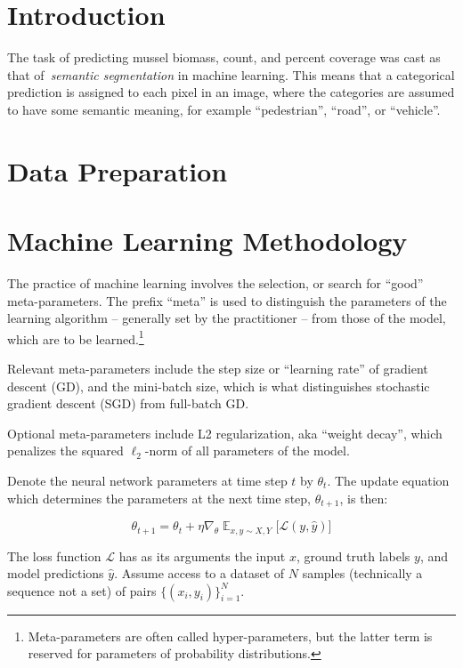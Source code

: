 \documentclass[11pt]{article} %
\begin{document}
\clearpage

\setcounter{page}{1}

\section{Introduction}

The task of predicting mussel biomass, count, and percent coverage was cast as
that of~\emph{semantic segmentation} in machine learning. This means that a 
categorical prediction is assigned to each pixel in an image, where the
categories are assumed to have some semantic meaning, for example 
``pedestrian'', ``road'', or ``vehicle''.

\section{Data Preparation}

\section{Machine Learning Methodology}

The practice of machine learning involves the selection, or search for ``good'' 
meta-parameters. The prefix ``meta'' is used to distinguish the parameters of
the learning algorithm -- generally set by the practitioner -- from those of the
model, which are to be learned.\footnote{Meta-parameters are often called
hyper-parameters, but the latter term is reserved for parameters of 
probability distributions.}

Relevant meta-parameters include the step size or ``learning rate'' of gradient
descent (GD), and the mini-batch size, which is what distinguishes stochastic
gradient descent (SGD) from full-batch GD. 

Optional meta-parameters include L2 regularization, aka ``weight decay'',
which penalizes the squared $\ell_2$-norm of all parameters of the model.

Denote the neural network parameters at time step $t$ by $\theta_t$. The update
equation which determines the parameters at the next time step, $\theta_{t + 
1}$, is then:

\begin{equation} \label{eq:sgd}
\theta_{t + 1} = \theta_t + \eta \nabla_{\theta} \mathop{\mathbb{E}}_{x,y \sim 
X, Y} \big[ \mathcal{L}(y, \hat{y}) \big]
\end{equation}

The loss function $\mathcal{L}$ has as its arguments the input $x$, ground
truth labels $y$, and model predictions $\hat{y}$. Assume access to a dataset 
of $N$ samples (technically a sequence not a set) of pairs 
$\{ (x_i, y_i)\}_{i=1}^{N} $.
\end{document}
